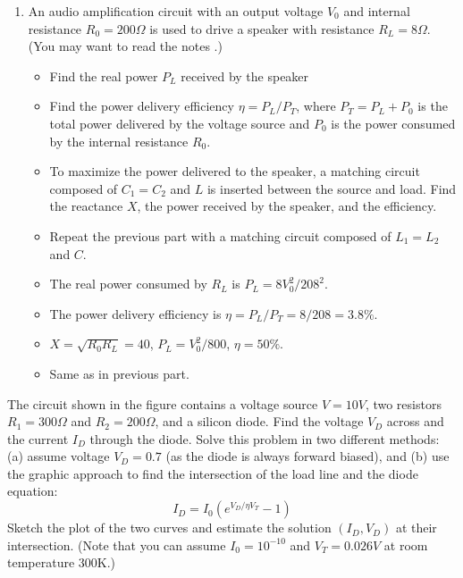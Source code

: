 \begin{enumerate}
\item An audio amplification circuit with an output voltage $V_0$ and internal
  resistance $R_0=200\Omega$ is used to drive a speaker with resistance 
  $R_L=8\Omega$. (You may want to read the notes 
  .)
  \begin{itemize}
  \item Find the real power $P_L$ received by the speaker
  \item Find the power delivery efficiency $\eta=P_L/P_T$, where
    $P_T=P_L+P_0$ is the total power delivered by the voltage source
    and $P_0$ is the power consumed by the internal resistance $R_0$.
  \item To maximize the power delivered to the speaker, a matching circuit
    composed of $C_1=C_2$ and $L$ is inserted between the source and load.
    Find the reactance $X$, the power received by the speaker, and the
    efficiency.
  \item Repeat the previous part with a matching circuit composed of
    $L_1=L_2$ and $C$.
  \end{itemize}



\begin{itemize}
\item The real power consumed by $R_L$ is $P_L=8V_0^2/208^2$.
\item The power delivery efficiency is $\eta=P_L/P_T=8/208=3.8\%$.
\item $X=\sqrt{R_0R_L}=40$, $P_L=V_0^2/800$, $\eta=50\%$.
\item Same as in previous part.
\end{itemize}

\end{enumerate}


\item The circuit shown in the figure contains a voltage source $V=10V$,
two resistors $R_1=300\Omega$ and $R_2=200\Omega$, and a silicon diode.
Find the voltage $V_D$ across and the current $I_D$ through the diode.
Solve this problem in two different methods: (a) assume voltage $V_D=0.7$ 
(as the diode is always forward biased), and (b) use the graphic approach
to find the intersection of the load line and the diode equation:
\[ I_D=I_0 ( e^{V_D/\eta V_T}-1 ) \]
Sketch the plot of the two curves and estimate the solution $(I_D,V_D)$
at their intersection. (Note that you can assume $I_0=10^{-10}$ and 
$V_T=0.026V$ at room temperature 300K.)

